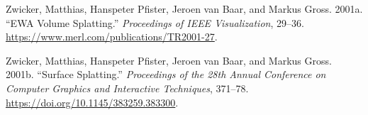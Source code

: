 \documentclass[
]{article}
\newlength{\cslhangindent}
\newenvironment{CSLReferences}[2] %
 {\begin{list}{}{%
  \setlength{\itemindent}{0pt}
  \setlength{\leftmargin}{0pt}
  \setlength{\parsep}{0pt}
  \ifodd #1
   \setlength{\leftmargin}{\cslhangindent}
   \setlength{\itemindent}{-1\cslhangindent}
  \fi
  \setlength{\itemsep}{#2\baselineskip}}}
 {\end{list}}
\begin{document}
\begin{CSLReferences}{1}{1}
Zwicker, Matthias, Hanspeter Pfister, Jeroen van Baar, and Markus Gross.
2001a. {``{EWA Volume Splatting}.''} \emph{Proceedings of IEEE
Visualization}, 29--36.
\url{https://www.merl.com/publications/TR2001-27}.

Zwicker, Matthias, Hanspeter Pfister, Jeroen van Baar, and Markus Gross.
2001b. {``{Surface Splatting}.''} \emph{Proceedings of the 28th Annual
Conference on Computer Graphics and Interactive Techniques}, 371--78.
\url{https://doi.org/10.1145/383259.383300}.

\end{CSLReferences}
\end{document}
